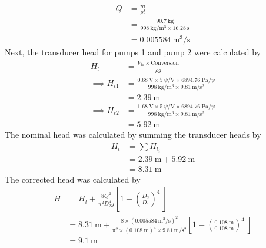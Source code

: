 \begin{align*}
    Q &= \frac{m}{\rho t} \\
    &= \frac{\qty{90.7}{\kilo\gram}}{\qty{998}{\kilo\gram\per\meter\cubed} \times \qty{16.28}{\second}} \\
    &= \qty{0.005584}{\meter\cubed\per\second}
\end{align*}
Next, the transducer head for pumps 1 and pump 2 were calculated by
\begin{align*}
    H_{t} &= \frac{V_{\text{tr}} \times \text{Conversion}}{\rho g} \\
    \implies H_{t1} &= \frac{\qty{0.68}{\volt} \times \qty{5}{\psi\per\volt} \times \qty{6894.76}{\pascal\per\psi}}{\qty{998}{\kilo\gram\per\meter\cubed} \times \qty{9.81}{\meter\per\second\squared}} \\
    &= \qty{2.39}{\meter} \\
    \implies H_{t2} &= \frac{\qty{1.68}{\volt} \times \qty{5}{\psi\per\volt} \times \qty{6894.76}{\pascal\per\psi}}{\qty{998}{\kilo\gram\per\meter\cubed} \times \qty{9.81}{\meter\per\second\squared}} \\
    &= \qty{5.92}{\meter}
\end{align*}
The nominal head was calculated by summing the transducer heads by
\begin{align*}
    H_{t} &= \sum H_{t_i} \\
    &= \qty{2.39}{\meter} + \qty{5.92}{\meter} \\
    &= \qty{8.31}{\meter}
\end{align*}
The corrected head was calculated by
\begin{align*}
    H &= H_t + \frac{8Q^2}{\pi^2 D_2^4 g} \left[1 - \left(\frac{D_2}{D_1}\right)^4\ \right] \\
    &= \qty{8.31}{\meter} + \frac{8 \times (\qty{0.005584}{\meter\cubed\per\second})^2}{\pi^2 \times (\qty{0.108}{\meter})^4 \times \qty{9.81}{\meter\per\second\squared}} \left[1 - \left(\frac{\qty{0.108}{\meter}}{\qty{0.108}{\meter}}\right)^4\ \right] \\
    &= \qty{9.1}{\meter}
\end{align*}

